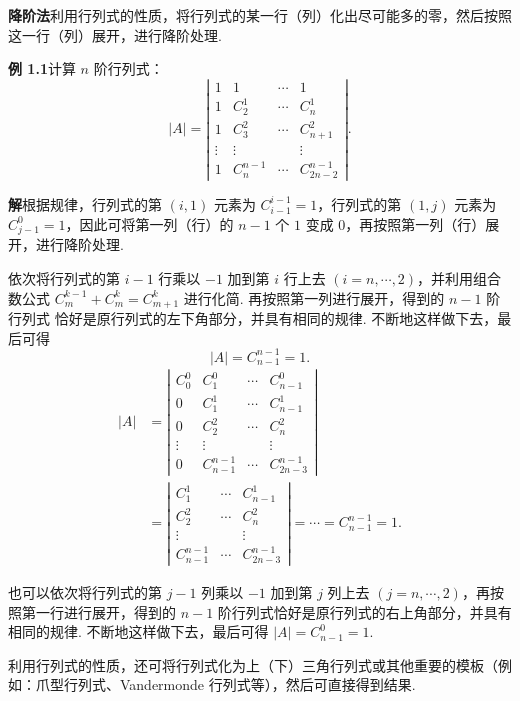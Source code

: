 \documentclass[UTF8,12pt,a4paper,fontset=fandol]{ctexart}
\begin{document}
\noindent\textbf{降阶法}\quad 利用行列式的性质，将行列式的某一行（列）化出尽可能多的零，然后按照这一行（列）展开，进行降阶处理.

\noindent\textbf{例 1.1}\quad 计算 $n$ 阶行列式：
\[
|A|=\left|\begin{array}{cccc}
1 & 1 & \cdots & 1\\
1 & C_2^1 & \cdots & C_n^1\\
1 & C_3^2 & \cdots & C_{n+1}^2\\
\vdots & \vdots &        & \vdots\\
1 & C_n^{n-1} & \cdots & C_{2n-2}^{n-1}
\end{array}\right|.
\]

\noindent\textbf{解}\quad 根据规律，行列式的第 $(i,1)$ 元素为 $C_{i-1}^{i-1}=1$，行列式的第 $(1,j)$ 元素为 $C_{j-1}^0=1$，因此可将第一列（行）的 $n-1$ 个 $1$ 变成 $0$，再按照第一列（行）展开，进行降阶处理.

依次将行列式的第 $i-1$ 行乘以 $-1$ 加到第 $i$ 行上去 $(i=n,\cdots,2)$，并利用组合数公式 $C_m^{k-1}+C_m^k=C_{m+1}^k$ 进行化简. 再按照第一列进行展开，得到的 $n-1$ 阶行列式
恰好是原行列式的左下角部分，并具有相同的规律. 不断地这样做下去，最后可得
\[
|A|=C_{n-1}^{n-1}=1.
\]
\[
\begin{aligned}
|A|
&=
\left|\begin{array}{cccc}
C_0^0 & C_1^0 & \cdots & C_{n-1}^0\\
0 & C_1^1 & \cdots & C_{n-1}^1\\
0 & C_2^2 & \cdots & C_n^2\\
\vdots & \vdots &        & \vdots\\
0 & C_{n-1}^{n-1} & \cdots & C_{2n-3}^{n-1}
\end{array}\right|\\
&=
\left|\begin{array}{ccc}
C_1^1 & \cdots & C_{n-1}^1\\
C_2^2 & \cdots & C_n^2\\
\vdots &        & \vdots\\
C_{n-1}^{n-1} & \cdots & C_{2n-3}^{n-1}
\end{array}\right|
=\cdots=C_{n-1}^{n-1}=1.
\end{aligned}
\]

也可以依次将行列式的第 $j-1$ 列乘以 $-1$ 加到第 $j$ 列上去 $(j=n,\cdots,2)$，再按照第一行进行展开，得到的 $n-1$ 阶行列式恰好是原行列式的右上角部分，并具有相同的规律. 不断地这样做下去，最后可得 $|A|=C_{n-1}^0=1$.

利用行列式的性质，还可将行列式化为上（下）三角行列式或其他重要的模板（例如：爪型行列式、Vandermonde 行列式等），然后可直接得到结果.
\end{document}
